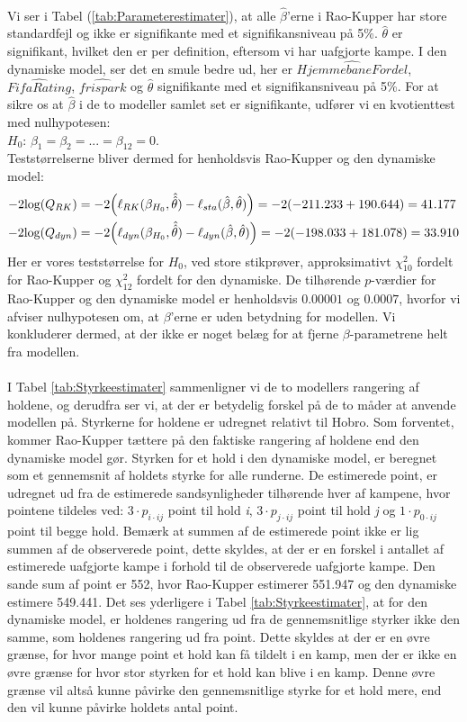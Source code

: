 \documentclass[11pt,a4paper]{article}
\begin{document}
\\Vi ser i Tabel (\ref{tab:Parameterestimater}), at alle $\hat{\beta}$'erne i Rao-Kupper har store standardfejl og ikke er signifikante med et signifikansniveau på 5\%. $\hat{\theta}$ er signifikant, hvilket den er per definition, eftersom vi har uafgjorte kampe. I den dynamiske model, ser det en smule bedre ud, her er $\hat{HjemmebaneFordel}$, $\hat{FifaRating}$, $\hat{frispark}$ og $\hat{\theta}$ signifikante med et signifikansniveau på 5\%. For at sikre os at $\hat{\beta}$ i de to modeller samlet set er signifikante, udfører vi en kvotienttest med nulhypotesen:\\
$H_0$: $\beta_1=\beta_2=...=\beta_{12} = 0$.\\
Teststørrelserne bliver dermed for henholdsvis Rao-Kupper og den dynamiske model:\\
\begin{align*}
    -2\text{log}(Q_{RK})&=-2\Big{(}\ell_{RK} (\beta_{H_0}, \hat{\hat{\theta}})-\ell_{sta} (\hat{\beta},\hat{\theta})\Big{)}=-2(-211.233+190.644)=41.177\\
    -2\text{log}(Q_{dyn})&=-2\Big{(}\ell_{dyn} (\beta_{H_0},\hat{\hat{\theta}})-\ell_{dyn} (\hat{\beta},\hat{\theta})\Big{)}=-2(-198.033+181.078)=33.910
\end{align*}
Her er vores teststørrelse for $H_0$, ved store stikprøver, approksimativt $\chi^2_{10}$ fordelt for Rao-Kupper og $\chi^2_{12}$ fordelt for den dynamiske. De tilhørende $p$-værdier for Rao-Kupper og den dynamiske model er henholdsvis $0.00001$ og $0.0007$, hvorfor vi afviser nulhypotesen om, at $\beta$'erne er uden betydning for modellen. Vi konkluderer dermed, at der ikke er noget belæg for at fjerne $\beta$-parametrene helt fra modellen.
\\\\I Tabel \ref{tab:Styrkeestimater} sammenligner vi de to modellers rangering af holdene, og derudfra ser vi, at der er betydelig forskel på de to måder at anvende modellen på. Styrkerne for holdene er udregnet relativt til Hobro. Som forventet, kommer Rao-Kupper tættere på den faktiske rangering af holdene end den dynamiske model gør. Styrken for et hold i den dynamiske model, er beregnet som et gennemsnit af holdets styrke for alle runderne. De estimerede point, er udregnet ud fra de estimerede sandsynligheder tilhørende hver af kampene, hvor pointene tildeles ved: $3 \cdot p_{i \cdot ij}$ point til hold \textit{i}, $3\cdot p_{j \cdot ij}$ point til hold \textit{j} og $1\cdot p_{0 \cdot ij}$ point til begge hold. Bemærk at summen af de estimerede point ikke er lig summen af de observerede point, dette skyldes, at der er en forskel i antallet af estimerede uafgjorte kampe i forhold til de observerede uafgjorte kampe. Den sande sum af point er 552, hvor Rao-Kupper estimerer 551.947 og den dynamiske estimere 549.441. Det ses yderligere i Tabel \ref{tab:Styrkeestimater}, at for den dynamiske model, er holdenes rangering ud fra de gennemsnitlige styrker ikke den samme, som holdenes rangering ud fra point. Dette skyldes at der er en øvre grænse, for hvor mange point et hold kan få tildelt i en kamp, men der er ikke en øvre grænse for hvor stor styrken for et hold kan blive i en kamp. Denne øvre grænse vil altså kunne påvirke den gennemsnitlige styrke for et hold mere, end den vil kunne påvirke holdets antal point. 
\end{document}
